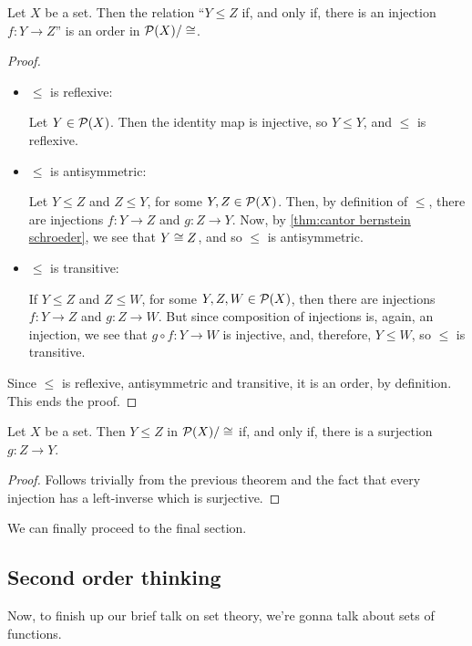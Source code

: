 \begin{theorem}\label{thm:cantor bernstein schroeder}
	Let $X$ be a set. Then the relation ``$Y\leq Z$ if, and only if, there is an injection $f:Y\to Z$'' is an order in $\mathcal P(X)/\cong$.
\end{theorem}
\begin{proof}
	\begin{itemize}
		\item $\leq$ is reflexive:
		
		Let $Y\in\mathcal P(X)$. Then the identity map is injective, so $Y\leq Y$, and $\leq$ is reflexive.
		
		\item $\leq$ is antisymmetric:
		
		Let $Y\leq Z$ and $Z\leq Y$, for some $Y,Z\in\mathcal P(X)$. Then, by definition of $\leq$, there are injections $f:Y\to Z$ and $g:Z\to Y$. Now, by \cref{thm:cantor bernstein schroeder}, we see that $Y\cong Z$, and so $\leq$ is antisymmetric.
		
		\item $\leq$ is transitive:
		
		If $Y\leq Z$ and $Z\leq W$, for some $Y,Z,W\in\mathcal P(X)$, then there are injections $f:Y\to Z$ and $g:Z\to W$. But since composition of injections is, again, an injection, we see that $g\circ f:Y\to W$ is injective, and, therefore, $Y\leq W$, so $\leq $ is transitive.
	\end{itemize}

Since $\leq$ is reflexive, antisymmetric and transitive, it is an order, by definition. This ends the proof.
\end{proof}
\begin{cor}
	Let $X$ be a set. Then $Y\leq Z$ in $\mathcal P(X)/\cong$ if, and only if, there is a surjection $g:Z\to Y$.
\end{cor}
\begin{proof}
	Follows trivially from the previous theorem and the fact that every injection has a left-inverse which is surjective.
\end{proof}

We can finally proceed to the final section.

\newpage
\subsection{Second order thinking}

Now, to finish up our brief talk on set theory, we're gonna talk about sets of functions.

